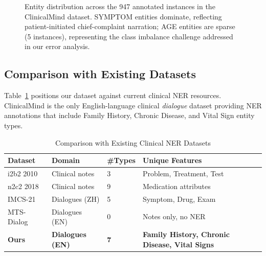 \documentclass[conference]{IEEEtran}
\begin{document}
\begin{figure}[t]
\centering
{}
\caption{Entity distribution across the 947 annotated instances in the
ClinicalMind dataset. SYMPTOM entities dominate, reflecting patient-initiated
chief-complaint narration; AGE entities are sparse (5 instances), representing
the class imbalance challenge addressed in our error analysis.}
\label{fig:entity_dist}
\end{figure}

\subsection{Comparison with Existing Datasets}

Table~\ref{tab:dataset_comp} positions our dataset against current clinical
NER resources. ClinicalMind is the only English-language clinical \emph{dialogue}
dataset providing NER annotations that include Family History, Chronic Disease,
and Vital Sign entity types.

\begin{table}[t]
\centering
\caption{Comparison with Existing Clinical NER Datasets}
\label{tab:dataset_comp}
\setlength{\tabcolsep}{4pt}
\begin{tabularx}{\columnwidth}{lllX}
\toprule
\textbf{Dataset} & \textbf{Domain} & \textbf{\#Types} & \textbf{Unique Features} \\
\midrule
i2b2 2010~\cite{uzuner2011}      & Clinical notes    & 3 & Problem, Treatment, Test \\
n2c2 2018~\cite{henry2020n2c2}   & Clinical notes    & 9 & Medication attributes \\
IMCS-21~\cite{chen2022imcs21}    & Dialogues (ZH)    & 5 & Symptom, Drug, Exam \\
MTS-Dialog~\cite{abacha2023mtsdialog} & Dialogues (EN)& 0 & Notes only, no NER \\
\midrule
\textbf{Ours}                    & \textbf{Dialogues (EN)} & \textbf{7} &
  \textbf{Family History, Chronic Disease, Vital Signs} \\
\bottomrule
\end{tabularx}
\end{table}
\end{document}
